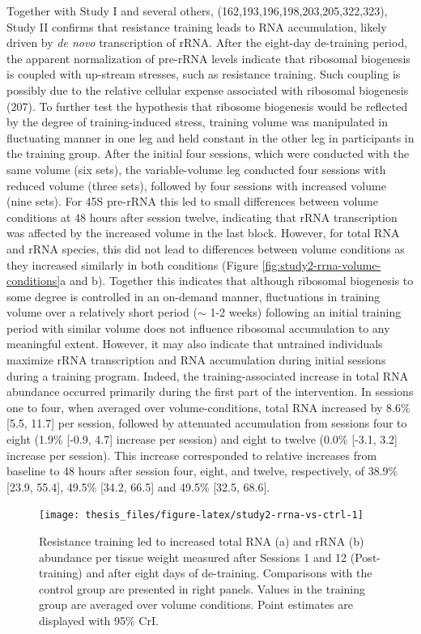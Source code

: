 \documentclass[twoside,10pt]{gihclass} %
\begin{document}
Together with Study I and several others,
(162,193,196,198,203,205,322,323),
Study II confirms that resistance training leads to RNA accumulation, likely driven by \emph{de novo} transcription of rRNA. After the eight-day de-training period, the apparent normalization of pre-rRNA levels indicate that ribosomal biogenesis is coupled with up-stream stresses, such as resistance training. Such coupling is possibly due to the relative cellular expense associated with ribosomal biogenesis (207).
To further test the hypothesis that ribosome biogenesis would be reflected by the degree of training-induced stress, training volume was manipulated in fluctuating manner in one leg and held constant in the other leg in participants in the training group.
After the initial four sessions, which were conducted with the same volume (six sets), the variable-volume leg conducted four sessions with reduced volume (three sets), followed by four sessions with increased volume (nine sets). For 45S pre-rRNA this led to small differences between volume conditions at 48 hours after session twelve, indicating that rRNA transcription was affected by the increased volume in the last block.
However, for total RNA and rRNA species, this did not lead to differences between volume conditions as they increased similarly in both conditions (Figure \ref{fig:study2-rrna-volume-conditions}a and b). Together this indicates that although ribosomal biogenesis to some degree is controlled in an on-demand manner, fluctuations in training volume over a relatively short period (\(\sim\) 1-2 weeks) following an initial training period with similar volume does not influence ribosomal accumulation to any meaningful extent.
However, it may also indicate that untrained individuals maximize rRNA transcription and RNA accumulation during initial sessions during a training program.
Indeed, the training-associated increase in total RNA abundance occurred primarily during the first part of the intervention. In sessions one to four, when averaged over volume-conditions, total RNA increased by 8.6\% {[}5.5, 11.7{]} per session, followed by attenuated accumulation from sessions four to eight (1.9\% {[}-0.9, 4.7{]} increase per session) and eight to twelve (0.0\% {[}-3.1, 3.2{]} increase per session). This increase corresponded to relative increases from baseline to 48 hours after session four, eight, and twelve, respectively, of 38.9\% {[}23.9, 55.4{]}, 49.5\% {[}34.2, 66.5{]} and 49.5\% {[}32.5, 68.6{]}.
\begin{figure}

{\centering \texttt{[image: thesis\_files/figure-latex/study2-rrna-vs-ctrl-1]} 

}

\caption[Total RNA and rRNA changes in response to resistance training in Study II.]{Resistance training led to increased total RNA (a) and rRNA (b) abundance per tissue weight measured after Sessions 1 and 12 (Post-training) and after eight days of de-training. Comparisons with the control group are presented in right panels. Values in the training group are averaged over volume conditions. Point estimates are displayed with 95\% CrI.}\label{fig:study2-rrna-vs-ctrl}
\end{figure}
\end{document}

